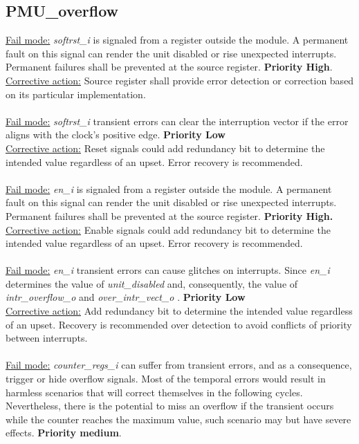 \subsection{PMU\_overflow}

\underline{Fail mode:} \textit{softrst\_i} is signaled from a register outside the module. A permanent fault on this signal can render the unit disabled or rise unexpected interrupts. Permanent failures shall be prevented at the source register. \textbf{Priority High}.\\
\underline{Corrective action:} Source register shall provide error detection or correction based on its particular implementation.\\
\\
\underline{Fail mode:} \textit{softrst\_i} transient errors can clear the interruption vector if the error aligns with the clock's positive edge. \textbf{Priority Low}\\
\underline{Corrective action:} Reset signals could add redundancy bit to determine the intended value regardless of an upset.  Error recovery is recommended.\\
\\
\underline{Fail mode:} \textit{en\_i }is signaled from a register outside the module. A permanent fault on this signal can render the unit disabled or rise unexpected interrupts. Permanent failures shall be prevented at the source register. \textbf{Priority High.}\\
\underline{Corrective action:} Enable signals could add redundancy bit to determine the intended value regardless of an upset. Error recovery is recommended.\\
\\
\underline{Fail mode:} \textit{en\_i} transient errors can cause glitches on interrupts. Since\textit{ en\_i} determines the value of \textit{unit\_disabled} and, consequently, the value of \textit{intr\_overflow\_o} and \textit{over\_intr\_vect\_o} . \textbf{Priority Low}\\
\underline{Corrective action:} Add redundancy bit to determine the intended value regardless of an upset. Recovery is recommended over detection to avoid conflicts of priority between interrupts.\\
\\
\underline{Fail mode:} \textit{counter\_regs\_i} can suffer from transient errors, and as a consequence, trigger or hide overflow signals. Most of the temporal errors would result in harmless scenarios that will correct themselves in the following cycles. Nevertheless, there is the potential to miss an overflow if the transient occurs while the counter reaches the maximum value, such scenario may but have severe effects. \textbf{Priority medium}.\\
